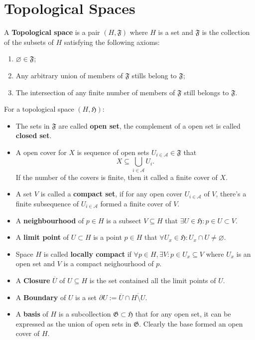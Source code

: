 \section{Topological Spaces}
\begin{definition}
A \textbf{Topological space} is a pair $(H,\mathfrak{F})$ where $H$ is a set and $\mathfrak{F}$ is the collection of the subsets of $H$ satisfying the following axioms:
\begin{enumerate}
\item $\varnothing\in\mathfrak{F}$;
\item Any arbitrary union of members of $\mathfrak{F}$ stills belong to $\mathfrak{F}$;
\item The intersection of any finite number of members of $\mathfrak{F}$ still belongs to $\mathfrak{F}$.
\end{enumerate}
\end{definition}

\begin{definition}
For a topological space $(H,\mathfrak{H})$:
\begin{itemize}
\item The sets in $\mathfrak{F}$ are called \textbf{open set}, the complement of a open set is called \textbf{closed set}.
\item A open cover for $X$ is sequence of open sets $U_{i\in\mathcal{A}}\in\mathfrak{F}$ that
\begin{equation}
X\subseteq \bigcup_{i\in \mathcal{A}}U_i.
\end{equation}
If the number of the covers is finite, then it called a finite cover of $X$.
\item A set $V$ is called a \textbf{compact set}, if for any open cover $U_{i\in\mathcal{A}}$ of $V$, there's a finite subsequence of $U_{i\in\mathcal{A}}$ formed a finite cover of $V$. 
\item A \textbf{neighbourhood} of $p\in H$ is a subsect $V\subseteq H$ that $\exists U\in\mathfrak{H}:p\in U\subset V$.
\item A \textbf{limit point} of $U\subset H$ is a point $p\in H$ that $\forall U_x\in\mathfrak{H}: U_x\cap U\ne\varnothing$. 
\item Space $H$ is called \textbf{locally compact} if $\forall p\in H, \exists V:p\in U_x\subseteq V$ where $U_x$ is an open set and $V$ is a compact neighourhood of $p$.
\item A \textbf{Closure} $\overline{U}$ of $U\subseteq H$ is the set contained all the limit points of $U$.
\item A \textbf{Boundary} of $U$ is a set $\partial U:=\overline{U}\cap\overline{H\setminus U}$.
\item A \textbf{basis} of $H$ is a subcollection $\mathfrak{G}\subset\mathfrak{H}$ that for any open set, it can be expressed as the union of open sets in $\mathfrak{G}$. Clearly the base formed an open cover of $H$.
\end{itemize}
\end{definition}

